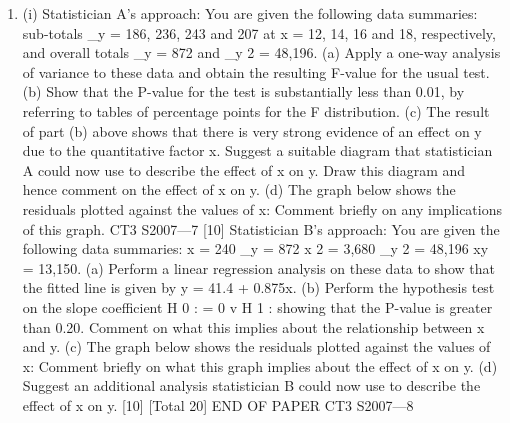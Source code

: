 \documentclass[a4paper,12pt]{article}
\begin{document}
\begin{enumerate}

[Total 19]
CT3 S2007—613
In a laboratory experiment a response variable (yield, y) is thought to be affected by a
quantitative factor (percentage of catalyst, x). The experiment involved making four
observations of y at each of four values of x, being 12%
resulted in the following observed response data.
12%
46
51
47
42
14%
56
57
63
60
16%
56
63
60
64
18%
47
51
54
55
These data are analysed by two statisticians, A and B, who use an analysis of variance
approach and a linear regression approach, respectively.
\item (i)
Statistician A’s approach:
You are given the following data summaries:
sub-totals \sigma_y = 186, 236, 243 and 207 at x = 12, 14, 16 and 18,
respectively, and overall totals \sigma_y = 872 and \sigma_y 2 = 48,196.
(a) Apply a one-way analysis of variance to these data and obtain the
resulting F-value for the usual test.
(b) Show that the P-value for the test is substantially less than 0.01, by
referring to tables of percentage points for the F distribution.
(c) The result of part (b) above shows that there is very strong evidence of
an effect on y due to the quantitative factor x. Suggest a suitable
diagram that statistician A could now use to describe the effect of x on
y. Draw this diagram and hence comment on the effect of x on y.
(d) The graph below shows the residuals plotted against the values of x:
Comment briefly on any implications of this graph.
CT3 S2007—7
[10]
Statistician B’s approach:
You are given the following data summaries:
\sigma x = 240 \sigma_y = 872 \sigma x 2 = 3,680 \sigma_y 2 = 48,196 \sigma xy = 13,150.
(a) Perform a linear regression analysis on these data to show that the
fitted line is given by y = 41.4 + 0.875x.
(b) Perform the hypothesis test on the slope coefficient
H 0 : \beta = 0 v H 1 : \beta {}
showing that the P-value is greater than 0.20.
Comment on what this implies about the relationship between x and y.
(c)
The graph below shows the residuals plotted against the values of x:
Comment briefly on what this graph implies about the effect of x on y.
(d)
Suggest an additional analysis statistician B could now use to describe
the effect of x on y.
[10]
[Total 20]
END OF PAPER
CT3 S2007—8



\end{enumerate}
\end{document}
